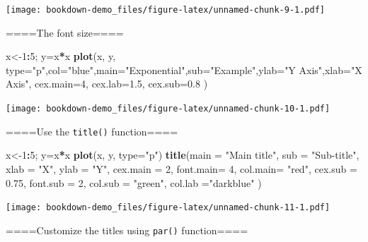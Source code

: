 \documentclass[]{book}
\newenvironment{Shaded}{\begin{snugshade}}{\end{snugshade}}
\newcommand{\KeywordTok}[1]{\textcolor[rgb]{0.13,0.29,0.53}{\textbf{#1}}}
\newcommand{\DataTypeTok}[1]{\textcolor[rgb]{0.13,0.29,0.53}{#1}}
\newcommand{\DecValTok}[1]{\textcolor[rgb]{0.00,0.00,0.81}{#1}}
\newcommand{\FloatTok}[1]{\textcolor[rgb]{0.00,0.00,0.81}{#1}}
\newcommand{\StringTok}[1]{\textcolor[rgb]{0.31,0.60,0.02}{#1}}
\newcommand{\OperatorTok}[1]{\textcolor[rgb]{0.81,0.36,0.00}{\textbf{#1}}}
\newcommand{\NormalTok}[1]{#1}
\begin{document}
\texttt{[image: bookdown-demo\_files/figure-latex/unnamed-chunk-9-1.pdf]}

====The font size====

\begin{Shaded}
\begin{Highlighting}[]
\NormalTok{x<-}\DecValTok{1}\OperatorTok{:}\DecValTok{5}\NormalTok{; y=x}\OperatorTok{*}\NormalTok{x}
\KeywordTok{plot}\NormalTok{(x, y, }\DataTypeTok{type=}\StringTok{"p"}\NormalTok{,}\DataTypeTok{col=}\StringTok{"blue"}\NormalTok{,}\DataTypeTok{main=}\StringTok{"Exponential"}\NormalTok{,}\DataTypeTok{sub=}\StringTok{"Example"}\NormalTok{,}\DataTypeTok{ylab=}\StringTok{"Y Axis"}\NormalTok{,}\DataTypeTok{xlab=}\StringTok{"X Axis"}\NormalTok{,}
     \DataTypeTok{cex.main=}\DecValTok{4}\NormalTok{, }\DataTypeTok{cex.lab=}\FloatTok{1.5}\NormalTok{, }\DataTypeTok{cex.sub=}\FloatTok{0.8}
\NormalTok{     )}
\end{Highlighting}
\end{Shaded}

\texttt{[image: bookdown-demo\_files/figure-latex/unnamed-chunk-10-1.pdf]}

====Use the \texttt{title()} function====

\begin{Shaded}
\begin{Highlighting}[]
\NormalTok{x<-}\DecValTok{1}\OperatorTok{:}\DecValTok{5}\NormalTok{; y=x}\OperatorTok{*}\NormalTok{x}
\KeywordTok{plot}\NormalTok{(x, y, }\DataTypeTok{type=}\StringTok{"p"}\NormalTok{)}
\KeywordTok{title}\NormalTok{(}\DataTypeTok{main =} \StringTok{"Main title"}\NormalTok{, }\DataTypeTok{sub =} \StringTok{"Sub-title"}\NormalTok{,}
      \DataTypeTok{xlab =} \StringTok{"X"}\NormalTok{, }\DataTypeTok{ylab =} \StringTok{"Y"}\NormalTok{,}
      \DataTypeTok{cex.main =} \DecValTok{2}\NormalTok{,   }\DataTypeTok{font.main=} \DecValTok{4}\NormalTok{, }\DataTypeTok{col.main=} \StringTok{"red"}\NormalTok{,}
      \DataTypeTok{cex.sub =} \FloatTok{0.75}\NormalTok{, }\DataTypeTok{font.sub =} \DecValTok{2}\NormalTok{, }\DataTypeTok{col.sub =} \StringTok{"green"}\NormalTok{,}
      \DataTypeTok{col.lab =}\StringTok{"darkblue"}
\NormalTok{      )}
\end{Highlighting}
\end{Shaded}

\texttt{[image: bookdown-demo\_files/figure-latex/unnamed-chunk-11-1.pdf]}

====Customize the titles using \texttt{par()} function====
\end{document}
